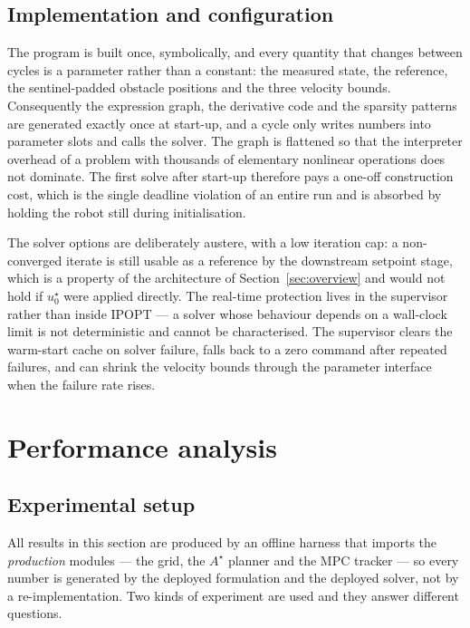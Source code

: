 \documentclass[11pt,a4paper]{article}
\newcommand{\astar}{$A^\star$}
\begin{document}
\subsection{Implementation and configuration}
\label{sec:impl}

The program is built once, symbolically, and every quantity that changes between cycles is a parameter rather
than a constant: the measured state, the reference, the sentinel-padded obstacle positions and the three
velocity bounds. Consequently the expression graph, the derivative code and the sparsity patterns are
generated exactly once at start-up, and a cycle only writes numbers into parameter slots and calls the
solver. The graph is flattened so that the interpreter overhead of a problem with thousands of elementary
nonlinear operations does not dominate. The first solve after start-up therefore pays a one-off construction
cost, which is the single deadline violation of an entire run and is absorbed by holding the robot still
during initialisation.

The solver options are deliberately austere, with a low iteration cap: a non-converged iterate is still
usable as a reference by the downstream setpoint stage, which is a property of the architecture of
Section~\ref{sec:overview} and would not hold if $u^\star_0$ were applied directly. The real-time protection
lives in the supervisor rather than inside IPOPT --- a solver whose behaviour depends on a wall-clock limit
is not deterministic and cannot be characterised. The supervisor clears the warm-start cache on solver
failure, falls back to a zero command after repeated failures, and can shrink the velocity bounds through the
parameter interface when the failure rate rises.

\section{Performance analysis}
\label{sec:performance}

\subsection{Experimental setup}
\label{sec:setup}

All results in this section are produced by an offline harness that imports the \emph{production} modules ---
the grid, the \astar{} planner and the MPC tracker --- so every number is generated by the deployed
formulation and the deployed solver, not by a re-implementation. Two kinds of experiment are used and they
answer different questions.
\end{document}
